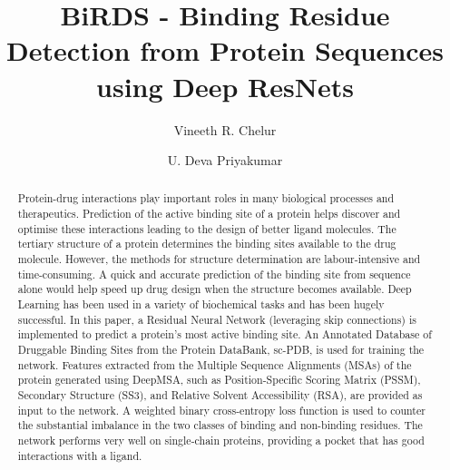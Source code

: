 \documentclass[journal=jacsat,manuscript=article]{achemso}
\author{Vineeth R. Chelur}
\author{U. Deva Priyakumar}
\affiliation[IIIT-H]
{Center for Computational Natural Sciences \& Bioinformatics \\ International Institute of Information Technology \\ Hyderabad - 500032, India}
\title[BiRDS - Binding Residue Detection from Protein Sequences using Deep ResNets]
  {BiRDS - Binding Residue Detection from Protein Sequences using Deep ResNets
  }
\begin{document}






\begin{abstract}
    \noindent Protein-drug interactions play important roles in many biological processes and therapeutics. Prediction of the active binding site of a protein helps discover and optimise these interactions leading to the design of better ligand molecules. The tertiary structure of a protein determines the binding sites available to the drug molecule. However, the methods for structure determination are labour-intensive and time-consuming. A quick and accurate prediction of the binding site from sequence alone would help speed up drug design when the structure becomes available. Deep Learning has been used in a variety of biochemical tasks and has been hugely successful. In this paper, a Residual Neural Network (leveraging skip connections) is implemented to predict a protein's most active binding site. An Annotated Database of Druggable Binding Sites from the Protein DataBank, sc-PDB, is used for training the network. Features extracted from the Multiple Sequence Alignments (MSAs) of the protein generated using DeepMSA, such as Position-Specific Scoring Matrix (PSSM), Secondary Structure (SS3), and Relative Solvent Accessibility (RSA), are provided as input to the network. A weighted binary cross-entropy loss function is used to counter the substantial imbalance in the two classes of binding and non-binding residues. The network performs very well on single-chain proteins, providing a pocket that has good interactions with a ligand.
\end{abstract}
\end{document}
